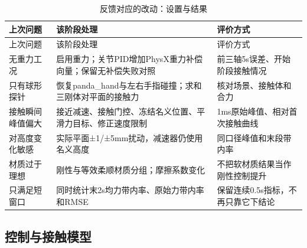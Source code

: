 \FloatBarrier\begingroup\small\setlength{\tabcolsep}{2.5pt}
\begin{longtable}[]{@{}
  >{\raggedright\arraybackslash}p{}
  >{\raggedright\arraybackslash}p{}
  >{\raggedright\arraybackslash}p{}@{}}
\caption{反馈对应的改动：设置与结果}\label{tab:s13-1}\tabularnewline
\toprule\noalign{}
\begin{minipage}[b]{\linewidth}\raggedright
上次问题
\end{minipage} & \begin{minipage}[b]{\linewidth}\raggedright
该阶段处理
\end{minipage} & \begin{minipage}[b]{\linewidth}\raggedright
评价方式
\end{minipage} \\
\midrule\noalign{}
\endfirsthead
\toprule\noalign{}
\begin{minipage}[b]{\linewidth}\raggedright
上次问题
\end{minipage} & \begin{minipage}[b]{\linewidth}\raggedright
该阶段处理
\end{minipage} & \begin{minipage}[b]{\linewidth}\raggedright
评价方式
\end{minipage} \\
\midrule\noalign{}
\endhead
\bottomrule\noalign{}
\endlastfoot
无重力工况 & 启用重力；关节PID增加PhysX重力补偿向量；保留无补偿失败对照 & 前三轴5s误差、开始阶段接触情况 \\
只有球形探针 & 恢复panda\_hand与左右手指碰撞；求和三刚体对平面的接触力 & 核对场景、接触体和合力 \\
接触瞬间峰值偏大 & 接近减速、接触门控、冻结名义位置、平滑力目标、修正速度限制 & 1ms原始峰值、相对首次接触曲线 \\
对高度变化敏感 & 实际平面±1/±5mm扰动，减速器仍使用名义高度 & 同口径峰值和末段带内率 \\
材质过于理想 & 刚性与等效柔顺材质分组；摩擦系数变化 & 不把软材质结果当作刚性控制提升 \\
只满足短窗口 & 同时统计末2s均力带内率、原始力带内率和RMSE & 保留连续0.5s指标，不再只靠它下结论 \\
\end{longtable}\endgroup

\subsection{控制与接触模型}\label{s13-detail-2}

